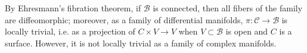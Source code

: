 \documentclass[12pt,a4paper,notitlepage]{article}
\theoremstyle{definition}
\theoremstyle{plain}
\newcommand{\mc}{\mathcal}
\numberwithin{equation}{section}
\begin{document}
By Ehresmann's fibration theorem, if $\mc B$ is connected, then all fibers of the family are diffeomorphic; moreover,  as a family of differential manifolds, $\pi:\mc C\rightarrow\mc B$ is locally trivial, i.e. as a projection of $C\times V\rightarrow V$ when $V\subset \mc B$ is open and $C$ is a surface. However, it is not locally trivial as a family of complex manifolds.                                                                                                                                                                                                                                                                                                                                                                                                                                                                                                                                                                                                                                                                                                                                                                                                                                                                                                                                                                                                                                                                                                                                                              
\end{document}
